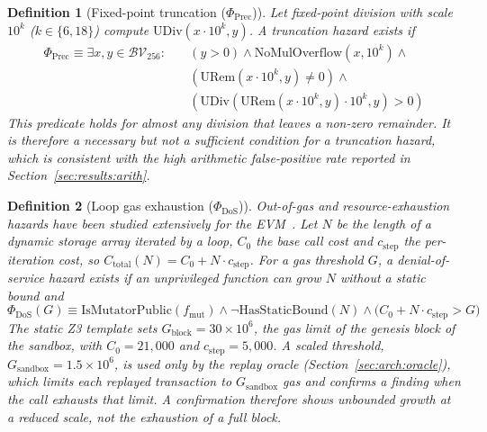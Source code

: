 \documentclass[pdflatex,sn-mathphys]{sn-jnl}
\theoremstyle{thmstyletwo}
\newtheorem{definition}{Definition}
\theoremstyle{thmstyletwo}
\begin{document}
\begin{definition}[Fixed-point truncation ($\Phi_{\mathrm{Prec}}$)]\label{prop:prec}
Let fixed-point division with scale $10^k$ ($k \in \{6, 18\}$) compute $\mathrm{UDiv}(x \cdot 10^k, y)$. A truncation hazard exists if
\begin{equation}
\begin{aligned}
    \Phi_{\mathrm{Prec}} \equiv \exists x, y \in \mathcal{BV}_{256} : \quad & (y > 0) \land \mathrm{NoMulOverflow}(x, 10^k) \land {} \\
    & (\mathrm{URem}(x \cdot 10^k, y) \neq 0) \land {} \\
    & \left( \mathrm{UDiv}(\mathrm{URem}(x \cdot 10^k, y)\cdot 10^k, y) > 0 \right)
\end{aligned}
\end{equation}
This predicate holds for almost any division that leaves a non-zero remainder. It is therefore a necessary but not a sufficient condition for a truncation hazard, which is consistent with the high arithmetic false-positive rate reported in Section~\ref{sec:results:arith}.
\end{definition}

\begin{definition}[Loop gas exhaustion ($\Phi_{\mathrm{DoS}}$)]\label{prop:dos}
Out-of-gas and resource-exhaustion hazards have been studied extensively for the EVM~\cite{grech2018madmax,albert2020gasol,perez2020broken}. Let $N$ be the length of a dynamic storage array iterated by a loop, $C_0$ the base call cost and $c_{\mathrm{step}}$ the per-iteration cost, so $C_{\mathrm{total}}(N) = C_0 + N \cdot c_{\mathrm{step}}$. For a gas threshold $G$, a denial-of-service hazard exists if an unprivileged function can grow $N$ without a static bound and
\begin{equation}
    \Phi_{\mathrm{DoS}}(G) \equiv \mathrm{IsMutatorPublic}(f_{\mathrm{mut}}) \land \neg \mathrm{HasStaticBound}(N) \land \big( C_0 + N \cdot c_{\mathrm{step}} > G \big)
\end{equation}
The static Z3 template sets $G_{\mathrm{block}} = 30 \times 10^6$, the gas limit of the genesis block of the sandbox, with $C_0 = 21{,}000$ and $c_{\mathrm{step}} = 5{,}000$. A scaled threshold, $G_{\mathrm{sandbox}} = 1.5 \times 10^6$, is used only by the replay oracle (Section~\ref{sec:arch:oracle}), which limits each replayed transaction to $G_{\mathrm{sandbox}}$ gas and confirms a finding when the call exhausts that limit. A confirmation therefore shows unbounded growth at a reduced scale, not the exhaustion of a full block.
\end{definition}
\end{document}
